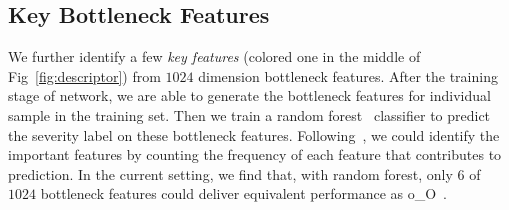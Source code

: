 \documentclass[letterpaper]{article} %
\begin{document}
	
    
    \subsection{Key Bottleneck Features}
    
   We further identify a few \emph{key features} (colored one in the middle of Fig~\ref{fig:descriptor}) from $1024$ dimension bottleneck features.  After the training stage of network, we are able to generate the bottleneck features for individual sample in the training set. Then we train a random forest~\cite{Dollar15PAMI} classifier to predict the severity label on these bottleneck features. Following~\cite{Gu17MICCAI}, we could identify the important features by counting the frequency of each feature that contributes to prediction. In the current setting, we find that, with random forest, only $6$  of  $1024$ bottleneck  features could deliver equivalent performance as o\_O~\cite{oO2016detector}.

    
	
\end{document}
